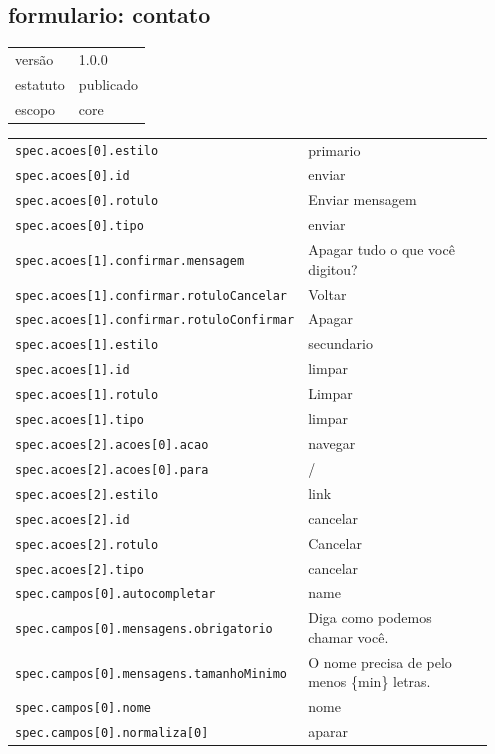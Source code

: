 \subsection*{formulario: contato}
\begin{tabular}{@{}ll@{}}
versão & 1.0.0 \\
estatuto & publicado \\
escopo & core \\
\end{tabular}

\begin{tabular}{@{}p{0.35\linewidth}p{0.6\linewidth}@{}}
\texttt{spec.acoes[0].estilo} & primario \\
\texttt{spec.acoes[0].id} & enviar \\
\texttt{spec.acoes[0].rotulo} & Enviar mensagem \\
\texttt{spec.acoes[0].tipo} & enviar \\
\texttt{spec.acoes[1].confirmar.mensagem} & Apagar tudo o que você digitou? \\
\texttt{spec.acoes[1].confirmar.rotuloCancelar} & Voltar \\
\texttt{spec.acoes[1].confirmar.rotuloConfirmar} & Apagar \\
\texttt{spec.acoes[1].estilo} & secundario \\
\texttt{spec.acoes[1].id} & limpar \\
\texttt{spec.acoes[1].rotulo} & Limpar \\
\texttt{spec.acoes[1].tipo} & limpar \\
\texttt{spec.acoes[2].acoes[0].acao} & navegar \\
\texttt{spec.acoes[2].acoes[0].para} & / \\
\texttt{spec.acoes[2].estilo} & link \\
\texttt{spec.acoes[2].id} & cancelar \\
\texttt{spec.acoes[2].rotulo} & Cancelar \\
\texttt{spec.acoes[2].tipo} & cancelar \\
\texttt{spec.campos[0].autocompletar} & name \\
\texttt{spec.campos[0].mensagens.obrigatorio} & Diga como podemos chamar você. \\
\texttt{spec.campos[0].mensagens.tamanhoMinimo} & O nome precisa de pelo menos \{min\} letras. \\
\texttt{spec.campos[0].nome} & nome \\
\texttt{spec.campos[0].normaliza[0]} & aparar \\

\end{tabular}
